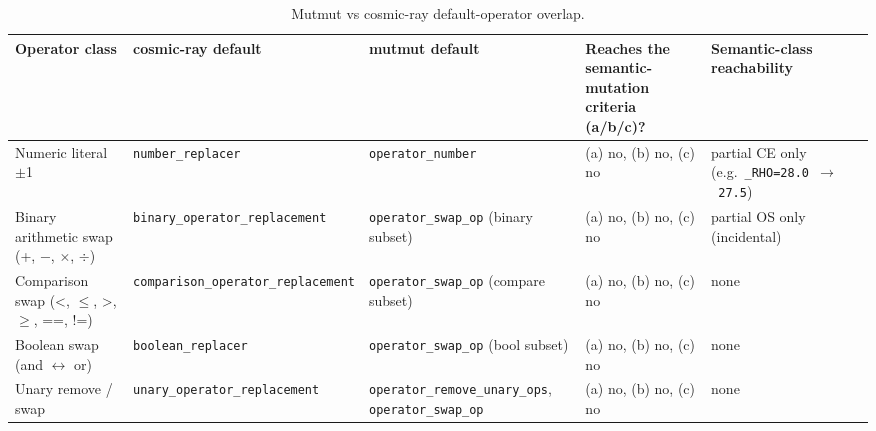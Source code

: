 \documentclass[manuscript,screen,review]{acmart}
\begin{document}
{\tiny{} %
\begin{longtable}[]{@{}
  >{\raggedright\arraybackslash}p{}
  >{\raggedright\arraybackslash}p{}
  >{\raggedright\arraybackslash}p{}
  >{\raggedright\arraybackslash}p{}
  >{\raggedright\arraybackslash}p{}@{}}
\caption{Mutmut vs cosmic-ray default-operator overlap.}\label{tab:p2-19}\\
\toprule\noalign{}
\begin{minipage}[b]{\linewidth}\raggedright
Operator class
\end{minipage} & \begin{minipage}[b]{\linewidth}\raggedright
cosmic-ray default
\end{minipage} & \begin{minipage}[b]{\linewidth}\raggedright
mutmut default
\end{minipage} & \begin{minipage}[b]{\linewidth}\raggedright
Reaches the semantic-mutation criteria (a/b/c)?
\end{minipage} & \begin{minipage}[b]{\linewidth}\raggedright
Semantic-class reachability
\end{minipage} \\
\midrule\noalign{}
\endfirsthead
\endhead
\bottomrule\noalign{}
\endlastfoot
Numeric literal $\pm$1 & \texttt{number\_replacer} &
\texttt{operator\_number} & (a) no, (b) no, (c) no & partial CE only
(e.g.~\texttt{\_RHO=28.0\ $\to$\ 27.5}) \\
Binary arithmetic swap (+, $-$, $\times$, $\div$) &
\texttt{binary\_operator\_replacement} & \texttt{operator\_swap\_op}
(binary subset) & (a) no, (b) no, (c) no & partial OS only
(incidental) \\
Comparison swap (\textless, $\leq$, \textgreater, $\geq$, ==, !=) &
\texttt{comparison\_operator\_replacement} & \texttt{operator\_swap\_op}
(compare subset) & (a) no, (b) no, (c) no & none \\
Boolean swap (and $\leftrightarrow$ or) & \texttt{boolean\_replacer} &
\texttt{operator\_swap\_op} (bool subset) & (a) no, (b) no, (c) no &
none \\
Unary remove / swap & \texttt{unary\_operator\_replacement} &
\texttt{operator\_remove\_unary\_ops}, \texttt{operator\_swap\_op} & (a)
no, (b) no, (c) no & none \\

\end{longtable}}
\end{document}

